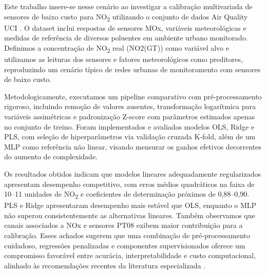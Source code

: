Este trabalho insere-se nesse cenário ao investigar a calibração multivariada de sensores de baixo custo para NO\textsubscript{2} utilizando o conjunto de dados Air Quality UCI \cite{Souza2025EDA,devito2008}. O dataset inclui respostas de sensores MOx, variáveis meteorológicas e medidas de referência de diversos poluentes em ambiente urbano monitorado. Definimos a concentração de NO\textsubscript{2} real (NO2(GT)) como variável alvo e utilizamos as leituras dos sensores e fatores meteorológicos como preditores, reproduzindo um cenário típico de redes urbanas de monitoramento com sensores de baixo custo.

Metodologicamente, executamos um pipeline comparativo com pré-processamento rigoroso, incluindo remoção de valores ausentes, transformação logarítmica para variáveis assimétricas e padronização Z-score com parâmetros estimados apenas no conjunto de treino. Foram implementados e avaliados modelos OLS, Ridge e PLS, com seleção de hiperparâmetros via validação cruzada K-fold, além de um MLP como referência não linear, visando mensurar os ganhos efetivos decorrentes do aumento de complexidade.

Os resultados obtidos indicam que modelos lineares adequadamente regularizados apresentam desempenho competitivo, com erros médios quadráticos na faixa de 10–11 unidades de NO\textsubscript{2} e coeficientes de determinação próximos de 0,88–0,90. PLS e Ridge apresentaram desempenho mais estável que OLS, enquanto o MLP não superou consistentemente as alternativas lineares. Também observamos que canais associados a NOx e sensores PT08 exibem maior contribuição para a calibração. Esses achados sugerem que uma combinação de pré-processamento cuidadoso, regressões penalizadas e componentes supervisionados oferece um compromisso favorável entre acurácia, interpretabilidade e custo computacional, alinhado às recomendações recentes da literatura especializada \cite{liu2021,xie2025,vanzoest2019,polat2021,ngocthuy2024}.

